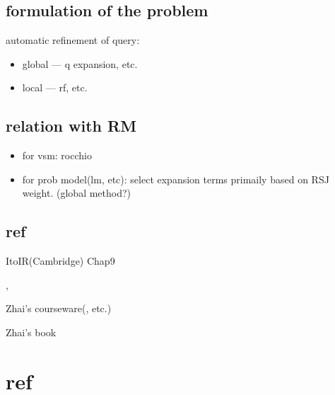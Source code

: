 \documentclass[•]{article}
\begin{document}
\subsection{formulation of the problem}
automatic refinement of query:

\begin{itemize}
\item global --- q expansion, etc.
\item local --- rf, etc.
\end{itemize}

\subsection{relation with RM}
\cite{Lv2011}
\begin{itemize}
\item for vsm:
rocchio
\item for prob model(lm, etc):
select expansion terms primaily based on RSJ weight. (global method?)
\end{itemize}
\subsection{ref}
ItoIR(Cambridge) Chap9

\cite{Lv2011}, \cite{Zhai2001}

Zhai's courseware(\cite{CS598CXZreadings}, etc.)

Zhai's book


\section{ref}




\end{document}
